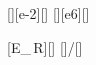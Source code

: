 [\centi\meter][e-2][\meter]
[\mega\volt\per\meter][e6][\volt\per\meter]

[E_\,R]{\EbX*\RsX}[\volt]
[]{\VX*\RsX/\nckcX}[\coulomb]

